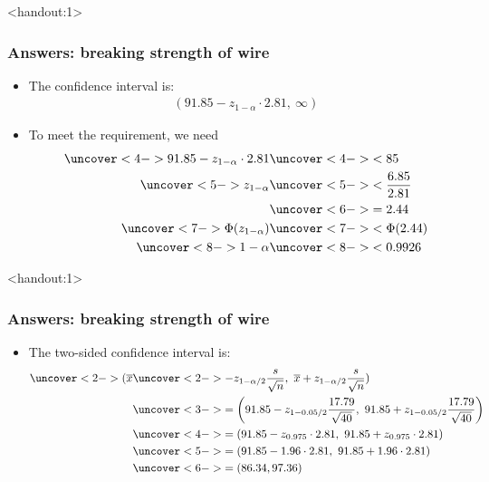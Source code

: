 \documentclass[handout]{beamer}\usepackage[]{graphicx}\usepackage[]{color}
\newcommand{\answers}{1}
\providecommand{\ov}[1]{\overline{#1}}
\numberwithin{equation}{section}
\begin{document}
\begin{frame}<handout:\answers>
\frametitle{Answers: breaking strength of wire} \scriptsize
\begin{itemize}
\item The confidence interval is:
\pause \begin{align*}
(91.85 - z_{1 - \alpha} \cdot 2.81, \ \infty)
\end{align*}
\pause \item To meet the requirement, we need 
\begin{align*}
\uncover<4->{91.85 - z_{1 - \alpha} \cdot 2.81} & \uncover<4->{< 85} \\
\uncover<5->{z_{1-\alpha}} & \uncover<5->{< \frac{6.85}{ 2.81}} \\
&\uncover<6->{= 2.44} \\
\uncover<7->{\Phi(z_{1 - \alpha})} & \uncover<7->{< \Phi(2.44)} \\
\uncover<8->{1 - \alpha} & \uncover<8->{< 0.9926}
\end{align*}
\end{itemize}
\end{frame}

\begin{frame}<handout:\answers>
\frametitle{Answers: breaking strength of wire}
\begin{itemize}
\item The two-sided confidence interval is:
\begin{align*}
\uncover<2->{(\ov{x}} & \uncover<2->{-z_{1 - \alpha/2} \frac{s}{\sqrt{n}}, \ \ov{x} + z_{1 - \alpha/2} \frac{s}{\sqrt{n}})} \\
&\uncover<3->{=\left (91.85 - z_{1 - 0.05/2} \frac{17.79}{\sqrt{40}}, \ 91.85 + z_{1 - 0.05/2} \frac{17.79}{\sqrt{40}} \right )} \\
&\uncover<4->{=(91.85 - z_{0.975} \cdot 2.81, \ 91.85 + z_{0.975} \cdot 2.81)} \\
&\uncover<5->{=(91.85 - 1.96\cdot 2.81, \ 91.85  + 1.96 \cdot 2.81)} \\
&\uncover<6->{=(86.34, 97.36)}
\end{align*}
\end{itemize}
\end{frame}
\end{document}
